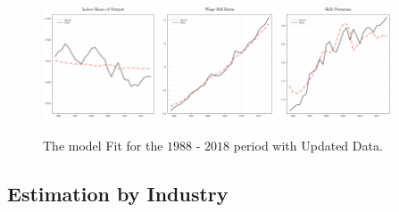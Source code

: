 \documentclass[12pt]{article}
\begin{document}
\begin{figure}[H]
 \centering
 \includegraphics[width=0.3\textwidth]{../images/fig:updated_ind_estimation_ls_doc.pdf}
 \hfill
 \includegraphics[width=0.3\textwidth]{../images/fig:updated_ind_estimation_wbr_doc.pdf}
 \hfill
 \includegraphics[width=0.3\textwidth]{../images/fig:updated_ind_estimation_sp_doc.pdf}
 \caption{\label{fig:korv_estimation_extended_industry} The model Fit for the $1988$ - $2018$ period with Updated Data.}
\end{figure}


\subsection{Estimation by Industry}
\end{document}

